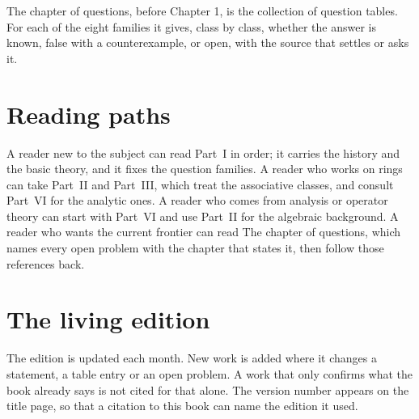 The chapter of questions, before Chapter 1, is the collection of question tables. %
For each of the eight families it gives, class by class, whether the answer is %
known, false with a counterexample, or open, with the source that settles or %
asks it. %

\section*{Reading paths}

A reader new to the subject can read Part~I in order; it carries the history and %
the basic theory, and it fixes the question families. %
A reader who works on rings can take Part~II and Part~III, which treat the %
associative classes, and consult Part~VI for the analytic ones. %
A reader who comes from analysis or operator theory can start with Part~VI and %
use Part~II for the algebraic background. %
A reader who wants the current frontier can read %
The chapter of questions, which names every open problem with the chapter %
that states it, then follow those references back. %

\section*{The living edition}

The edition is updated each month. %
New work is added where it changes a statement, a table entry or an open %
problem. %
A work that only confirms what the book already says is not cited for that %
alone. %
The version number appears on the title page, so that a citation to this book %
can name the edition it used. %
